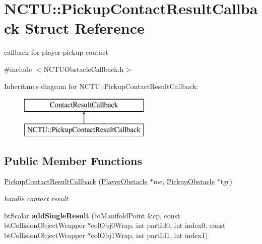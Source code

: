 \hypertarget{struct_n_c_t_u_1_1_pickup_contact_result_callback}{}\section{N\+C\+TU\+:\+:Pickup\+Contact\+Result\+Callback Struct Reference}
\label{struct_n_c_t_u_1_1_pickup_contact_result_callback}


callback for player-\/pickup contact  




{\ttfamily \#include $<$N\+C\+T\+U\+Obstacle\+Callback.\+h$>$}

Inheritance diagram for N\+C\+TU\+:\+:Pickup\+Contact\+Result\+Callback\+:\begin{figure}[H]
\begin{center}
\leavevmode
\includegraphics[height=2.000000cm]{struct_n_c_t_u_1_1_pickup_contact_result_callback}
\end{center}
\end{figure}
\subsection*{Public Member Functions}
\begin{DoxyCompactItemize}
\item 
\hyperlink{struct_n_c_t_u_1_1_pickup_contact_result_callback_a3e8d27c4845c0472728072d79e2b7c18}{Pickup\+Contact\+Result\+Callback} (\hyperlink{class_n_c_t_u_1_1_player_obstacle}{Player\+Obstacle} $\ast$me, \hyperlink{class_n_c_t_u_1_1_pickup_obstacle}{Pickup\+Obstacle} $\ast$tgr)\hypertarget{struct_n_c_t_u_1_1_pickup_contact_result_callback_a3e8d27c4845c0472728072d79e2b7c18}{}\label{struct_n_c_t_u_1_1_pickup_contact_result_callback_a3e8d27c4845c0472728072d79e2b7c18}

\begin{DoxyCompactList}\small\item\em handle contact result \end{DoxyCompactList}\item 
bt\+Scalar {\bfseries add\+Single\+Result} (bt\+Manifold\+Point \&cp, const bt\+Collision\+Object\+Wrapper $\ast$col\+Obj0\+Wrap, int part\+Id0, int index0, const bt\+Collision\+Object\+Wrapper $\ast$col\+Obj1\+Wrap, int part\+Id1, int index1)\hypertarget{struct_n_c_t_u_1_1_pickup_contact_result_callback_af517d6df2bca3cfaa30a30953a2d8e74}{}\label{struct_n_c_t_u_1_1_pickup_contact_result_callback_af517d6df2bca3cfaa30a30953a2d8e74}

\end{DoxyCompactItemize}

